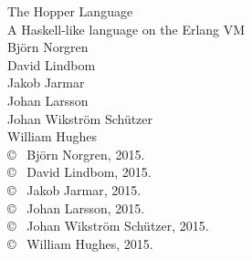 %	
%	


\newpage
\thispagestyle{plain}
\vspace*{4.5cm}
The Hopper Language\\
A Haskell-like language on the Erlang VM\\
Björn Norgren\\
David Lindbom\\
Jakob Jarmar\\
Johan Larsson\\
Johan Wikström Schützer\\
William Hughes\\[0.5cm]

\copyright ~ Björn Norgren, 2015.\\
\copyright ~ David Lindbom, 2015.\\
\copyright ~ Jakob Jarmar, 2015.\\
\copyright ~ Johan Larsson, 2015.\\
\copyright ~ Johan Wikström Schützer, 2015.\\
\copyright ~ William Hughes, 2015.\\[0.5cm]

